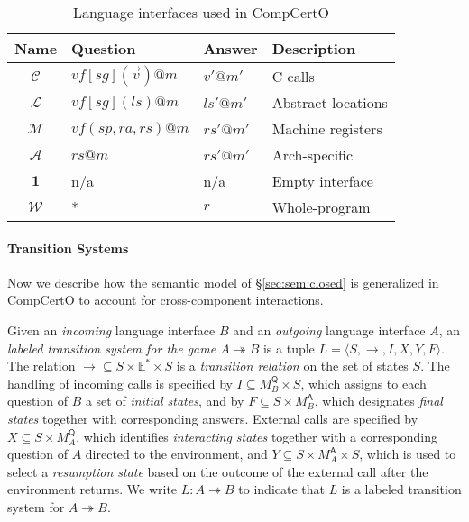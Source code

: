 \documentclass[sigplan,10pt,review,anonymous]{acmart}
\newcommand{\kw}[1]{\ensuremath{ \mathsf{#1} }}
\begin{document}

\begin{table} %
  \begin{tabular}{clll}
    \hline
    Name & Question & Answer & Description \\
    \hline
    $\mathcal{C}$ &
      $\mathit{vf}[\mathit{sg}](\vec{v})@m$ & $v'@m'$ &
      C calls \\
    $\mathcal{L}$ &
      $\mathit{vf}[\mathit{sg}](\mathit{ls})@m$ & $\mathit{ls}'@m'$ &
      Abstract locations \\
    $\mathcal{M}$ &
      $\mathit{vf}(\mathit{sp},\mathit{ra},\mathit{rs})@m$ & $\mathit{rs}'@m'$ &
      Machine registers \\
    $\mathcal{A}$ &
      $\mathit{rs}@m$ & $\mathit{rs}'@m'$ &
      Arch-specific \\
    $\mathbf{1}$ & n/a & n/a &
      Empty interface \\
    $\mathcal{W}$ & * & $r$ &
      Whole-program \\
    \hline
  \end{tabular}
  \caption{Language interfaces used in CompCertO}
  \label{tbl:li}
\end{table}

\paragraph{Transition Systems} %

Now we describe how the semantic model of
\S\ref{sec:sem:closed}
is generalized in CompCertO
to account for cross-component interactions.

\begin{definition}
Given an \emph{incoming} language interface $B$
and an \emph{outgoing} language interface $A$,
an \emph{labeled transition system for the game $A \twoheadrightarrow B$}
is a tuple $L = \langle S, \rightarrow, I, X, Y, F \rangle$.
The relation
${\rightarrow} \subseteq S \times \mathbb{E}^* \times S$ is
a \emph{transition relation} on the set of states $S$.
The handling of incoming calls is specified by
$I \subseteq M_B^\kw{Q} \times S$, which
assigns to each question of $B$ a set of \emph{initial states}, and by
$F \subseteq S \times M_B^\kw{A}$,
which designates \emph{final states} together with corresponding answers.
External calls are specified by
$X \subseteq S \times M_A^\kw{Q}$,
which identifies \emph{interacting states} together with
a corresponding question of $A$ directed to the environment, and
$Y \subseteq S \times M_A^\kw{A} \times S$,
which is used to select a \emph{resumption state}
based on the outcome of the external call
after the environment returns.
We write $L : A \twoheadrightarrow B$ to indicate that
$L$ is a labeled transition system for $A \twoheadrightarrow B$.
\end{definition}
\end{document}
